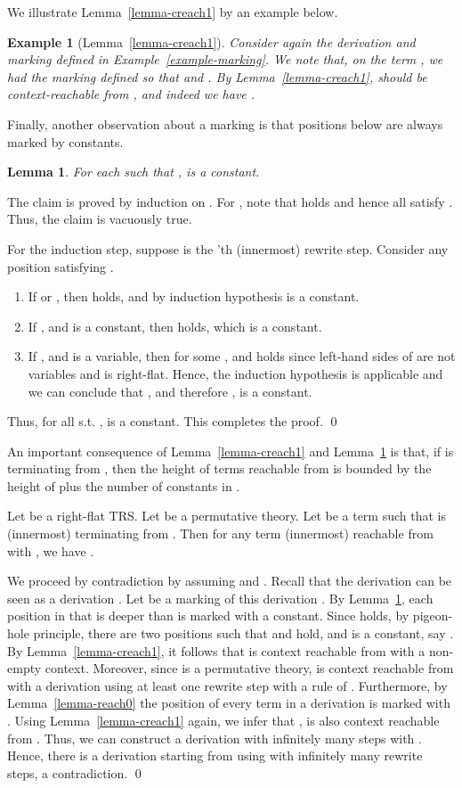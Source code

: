 \documentclass{LMCS}
\theoremstyle{plain}
\newtheorem{lemma}[thm]{Lemma}
\newtheorem{example}[thm]{Example}
\begin{document}
We illustrate Lemma~\ref{lemma-creach1} by an example below.
\begin{example}[Lemma~\ref{lemma-creach1}]
Consider again the derivation and marking defined in
Example~\ref{example-marking}.
We note that, on the term ,
we had the marking  defined so that
 and .
By Lemma~\ref{lemma-creach1},  should be context-reachable
from , and indeed we have .
\end{example}

Finally, another observation about a marking is 
that positions below  are always
marked by constants.
\begin{lemma}\label{lemma-creach2}
For each  such that ,
 is a constant.
\end{lemma}
\proof
The claim is proved by induction on .
For , note that  holds and hence all 
satisfy . Thus, the claim is vacuously true.

For the induction step,
suppose  is
the 'th (innermost) rewrite step. Consider any position  satisfying
.
\begin{enumerate}[]
\item If  or ,
then  holds, and by induction hypothesis
 is a constant.
\item
If ,  and  is a constant, 
then  holds, which is a constant.
\item
If ,  and  is a variable, then
 for some , and
 holds since left-hand sides of 
are not variables and  is right-flat.
Hence, the induction hypothesis is applicable and
we can conclude that , and therefore
, is a constant.
\end{enumerate}
Thus, for all  s.t. ,  is a constant.
This completes the proof. \qed


An important consequence of Lemma~\ref{lemma-creach1}
and Lemma~\ref{lemma-creach2}
is that, if  is terminating from ,
then the height of terms reachable from  is
bounded by the height of  plus the number of
constants in .
\begin{cor}\label{corollary-bounded}
Let  be a right-flat TRS.
Let  be a permutative theory.
Let  be a term
such that  is (innermost) terminating from .
Then for any term  (innermost) reachable from  with ,
we have .
\end{cor}
\proof
We proceed by contradiction by assuming
 and .
Recall that the derivation  can be seen
as a derivation .
Let  be a marking of this derivation
.
By Lemma~\ref{lemma-creach2}, each position in  that
is deeper than  is marked with a constant.
Since
 holds,
by pigeon-hole principle, there are two positions
 such that
 and  hold, and  is a constant, say .
By Lemma~\ref{lemma-creach1}, it follows that
 is context reachable from  with a non-empty context.
Moreover, since  is a permutative theory,
 is context reachable from  with a derivation using
at least one rewrite step with a rule of .
Furthermore,
by Lemma~\ref{lemma-reach0} the position  of every term in
a derivation is marked with .
Using Lemma~\ref{lemma-creach1} again,
we infer that , is also context reachable from .
Thus, we can construct a derivation
 with infinitely many
steps with .
Hence, there is a derivation starting from  using 
with infinitely many rewrite steps, a contradiction. \qed
\end{document}
